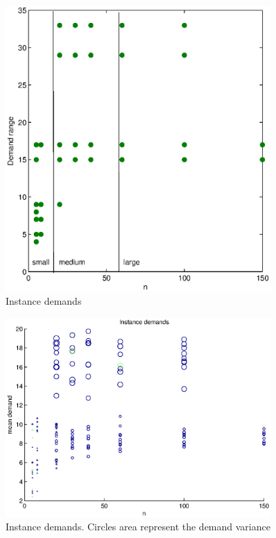 \begin{figure}[!htbp]
  \begin{center}
   \includegraphics[width=0.9\textwidth]{Images/Chapter5/instances.eps}
  \end{center}
    \caption{Instance demands}\label{fig:instances}
\end{figure}


\begin{figure}[!htbp]
  \begin{center}
   \includegraphics[width=0.9\textwidth]{Images/Chapter5/demands.eps}
  \end{center}
    \caption{Instance demands. Circles area represent the demand variance}\label{fig:demands}
\end{figure}

